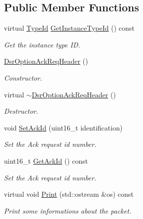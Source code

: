 \subsection*{Public Member Functions}
\begin{DoxyCompactItemize}
\item 
virtual \hyperlink{classns3_1_1TypeId}{Type\+Id} \hyperlink{classns3_1_1dsr_1_1DsrOptionAckReqHeader_a1d47bae19cdacc821404b686fdf16125}{Get\+Instance\+Type\+Id} () const 
\begin{DoxyCompactList}\small\item\em Get the instance type ID. \end{DoxyCompactList}\item 
\hyperlink{classns3_1_1dsr_1_1DsrOptionAckReqHeader_a4a4b7af0c5272d6a59c19a6f1c6e536b}{Dsr\+Option\+Ack\+Req\+Header} ()
\begin{DoxyCompactList}\small\item\em Constructor. \end{DoxyCompactList}\item 
virtual \hyperlink{classns3_1_1dsr_1_1DsrOptionAckReqHeader_aef49775a90835312034b30a20fead5d0}{$\sim$\+Dsr\+Option\+Ack\+Req\+Header} ()
\begin{DoxyCompactList}\small\item\em Destructor. \end{DoxyCompactList}\item 
void \hyperlink{classns3_1_1dsr_1_1DsrOptionAckReqHeader_a8eb91c0ed78e98e83af9cfbeb553e48f}{Set\+Ack\+Id} (uint16\+\_\+t identification)
\begin{DoxyCompactList}\small\item\em Set the Ack request id number. \end{DoxyCompactList}\item 
uint16\+\_\+t \hyperlink{classns3_1_1dsr_1_1DsrOptionAckReqHeader_ae6dacae0f5d8ccead95a456e9524d085}{Get\+Ack\+Id} () const 
\begin{DoxyCompactList}\small\item\em Set the Ack request id number. \end{DoxyCompactList}\item 
virtual void \hyperlink{classns3_1_1dsr_1_1DsrOptionAckReqHeader_ab029fdf0ad6cb0e0688878b35d447f32}{Print} (std\+::ostream \&os) const 
\begin{DoxyCompactList}\small\item\em Print some informations about the packet. \end{DoxyCompactList}\item 

\end{DoxyCompactItemize}
